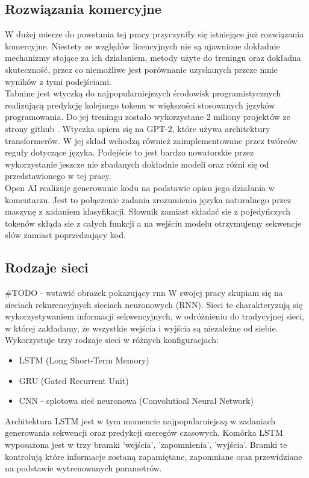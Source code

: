 \subsection {Rozwiązania komercyjne}
W dużej mierze do powstania tej pracy przyczyniły się istniejące już rozwiązania komercyjne. Niestety 
ze względów licencyjnych nie są ujawnione dokładnie mechanizmy stojące za ich działaniem, metody użyte 
do treningu oraz dokładna skuteczność, przez co niemożliwe jest porównanie uzyskanych przeze mnie wyników 
z tymi podejściami. \\

Tabnine \cite{tabnine} jest wtyczką do najpopularniejszych środowisk programistycznych realizującą predykcję kolejnego tokenu w 
większości stosowanych języków programowania. Do jej treningu zostało wykorzystane 2 miliony projektów ze strony github \cite{github}. 
Wtyczka opiera się na GPT-2, które używa architektury transformerów. W jej skład wchodzą również zaimplementowane przez twórców
reguły dotyczące języka. Podejście to jest bardzo nowatorskie przez wykorzystanie jeszcze nie zbadanych dokładnie modeli oraz 
różni się od przedstawionego w tej pracy.\\

Open AI realizuje generowanie kodu na podstawie opisu jego działania w komentarzu. Jest to połączenie zadania zrozumienia 
języka naturalnego przez maszynę z zadaniem klasyfikacji. Słownik zamiast składać sie z pojedyńczych tokenów skłąda sie z całych funkcji 
a na wejściu modelu otrzymujemy sekwencje słów zamiast poprzedzający kod. 

\subsection {Rodzaje sieci}
\#TODO - wstawić obrazek pokazujący rnn
W swojej pracy skupiam się na sieciach rekurencyjnych sieciach neuronowych (RNN). Sieci te charakteryzują się wykorzystywaniem informacji 
sekwencyjnych, w odróżnieniu do tradycyjnej sieci, w której zakładamy, że wszystkie wejścia i wyjścia są niezależne od siebie. Wykorzystuje 
trzy rodzaje sieci w różnych konfiguracjach: 
\begin{itemize}
    \item LSTM (Long Short-Term Memory)
    \item GRU (Gated Recurrent Unit)
    \item CNN - splotowa sieć neuronowa (Convolutioal Neural Network)
\end{itemize}
Architektura LSTM jest w tym momencie najpopularniejszą w zadaniach generowania sekwencji oraz predykcji szeregów czasowych. Komórka LSTM 
wyposażona jest w trzy bramki 'wejścia',  'zapomnienia', 'wyjścia'. Bramki te kontrolują które informacje zostaną zapamiętane, zapomniane
oraz przewidziane na podstawie wytrenowanych parametrów. 


